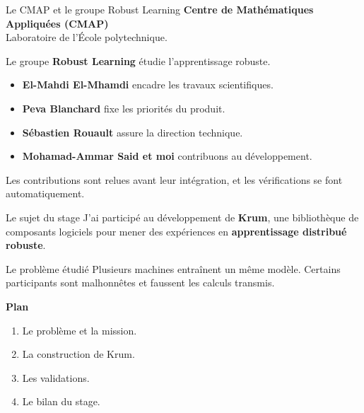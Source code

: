 \maketitle

\begin{frame}{Le CMAP et le groupe Robust Learning}
    \textbf{Centre de Mathématiques Appliquées (CMAP)}\\
    Laboratoire de l'École polytechnique.

    Le groupe \textbf{Robust Learning} étudie l'apprentissage robuste.

    \begin{itemize}
        \item \textbf{El-Mahdi El-Mhamdi} encadre les travaux scientifiques.
        \item \textbf{Peva Blanchard} fixe les priorités du produit.
        \item \textbf{Sébastien Rouault} assure la direction technique.
        \item \textbf{Mohamad-Ammar Said et moi} contribuons au développement.
    \end{itemize}

    Les contributions sont relues avant leur intégration, et les vérifications
    se font automatiquement.
\end{frame}

\begin{frame}{Le sujet du stage}
    J'ai participé au développement de \textbf{Krum}, une bibliothèque de
    composants logiciels pour mener des expériences en
    \textbf{apprentissage distribué robuste}.

    \begin{block}{Le problème étudié}
        Plusieurs machines entraînent un même modèle.
        Certains participants sont \alert{malhonnêtes} et faussent les calculs transmis.
    \end{block}

    \textbf{Plan}
    \begin{enumerate}
        \item Le problème et la mission.
        \item La construction de Krum.
        \item Les validations.
        \item Le bilan du stage.
    \end{enumerate}
\end{frame}
